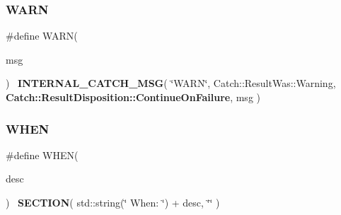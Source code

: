 \mbox{\label{catch_8hpp_a108d6c5c51dd46e82a62b262394f0242}} 
\subsubsection{W\+A\+RN}
{\footnotesize\ttfamily \#define W\+A\+RN(\begin{DoxyParamCaption}\item[{}]{msg }\end{DoxyParamCaption})~\textbf{ I\+N\+T\+E\+R\+N\+A\+L\+\_\+\+C\+A\+T\+C\+H\+\_\+\+M\+SG}( \char`\"{}W\+A\+RN\char`\"{}, Catch\+::\+Result\+Was\+::\+Warning, \textbf{ Catch\+::\+Result\+Disposition\+::\+Continue\+On\+Failure}, msg )}

\mbox{\label{catch_8hpp_ab09e9b8186233f676ce6a23aebe89d6e}} 
\subsubsection{W\+H\+EN}
{\footnotesize\ttfamily \#define W\+H\+EN(\begin{DoxyParamCaption}\item[{}]{desc }\end{DoxyParamCaption})~\textbf{ S\+E\+C\+T\+I\+ON}( std\+::string(\char`\"{}    When\+: \char`\"{}) + desc, \char`\"{}\char`\"{} )}

